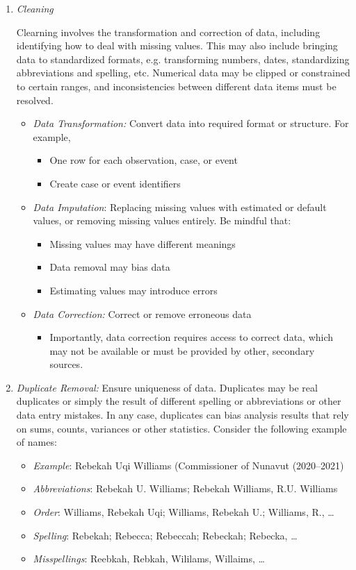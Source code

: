 \begin{enumerate}
\item \emph{Cleaning} 

Clearning involves the transformation and correction of data, including identifying how to deal with missing values. This may also include bringing data to standardized formats, e.g. transforming numbers, dates, standardizing abbreviations and spelling, etc. Numerical data may be clipped or constrained to certain ranges, and inconsistencies between different data items must be resolved.
\begin{itemize}
	\item \emph{Data Transformation:} Convert data into required format or structure. For example,
	\begin{itemize}
	  \item One row for each observation, case, or event
	  \item Create case or event identifiers
	\end{itemize}
	\item \emph{Data Imputation}: Replacing missing values with estimated or default values, or removing missing values entirely. Be mindful that:
	\begin{itemize}
	  \item Missing values may have different meanings
	  \item Data removal may bias data
	  \item Estimating values may introduce errors
	\end{itemize}
	\item \emph{Data Correction:} Correct or remove erroneous data
	\begin{itemize}
	  \item Importantly, data correction requires access to correct data, which may not be available or must be provided by other, secondary sources.
	\end{itemize}
\end{itemize}

\item \emph{Duplicate Removal:} Ensure uniqueness of data. Duplicates may be real duplicates or simply the result of different spelling or abbreviations or other data entry mistakes. In any case, duplicates can bias analysis results that rely on sums, counts, variances or other statistics. Consider the following example of names:
 \begin{itemize}
   \item \emph{Example}: Rebekah Uqi Williams (Commissioner of Nunavut (2020--2021)
   \item \emph{Abbreviations}: Rebekah U. Williams; Rebekah Williams, R.U. Williams
   \item \emph{Order}: Williams, Rebekah Uqi; Williams, Rebekah U.; Williams, R., \ldots
   \item \emph{Spelling}: Rebekah; Rebecca; Rebeccah; Rebeckah; Rebecka, \ldots
   \item \emph{Misspellings}: Reebkah, Rebkah, Wililams, Willaims, \ldots
 \end{itemize}


\end{enumerate}
